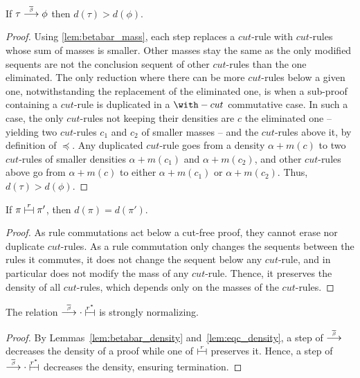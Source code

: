 \documentclass{lmcs}
\newcommand{\symboltext}[2]{\mathrel{\overset{\makebox[0pt]{\mbox{\normalfont\tiny\sffamily \ensuremath{#1}}}}{#2}}} %
\newcommand{\betabar}{\overline{\beta}}
\newcommand{\betabarto}{\symboltext{\betabar}{\longrightarrow}}
\newcommand{\vdashv}{\mathrel{\lower .22ex \hbox{$\vdash\!\dashv$}}}
\DeclareRobustCommand{\astsymbol}[1]{\mathrel{\ooalign{{$\vdashv$}\crcr{$\stackrel{#1}{\hphantom{\vdashv}\vphantom{\to}}$}}}}
\newcommand{\eqcone}{\astsymbol{r}} %
\newcommand{\eqc}{\astsymbol{r^\ast}} %
\newcommand*{\mass}[1]{m(#1)}
\newcommand*{\density}[1]{d(#1)}
\newcommand*{\ordercut}{\preccurlyeq}
\begin{document}
\begin{lem}
\label{lem:betabar_density}
If $\tau \betabarto \phi$ then $\density{\tau} > \density{\phi}$.
\end{lem}
\begin{proof}
Using \autoref{lem:betabar_mass}, each step replaces a $cut$-rule with $cut$-rules whose sum of masses is smaller.
Other masses stay the same as the only modified sequents are not the conclusion sequent of other $cut$-rules than the one eliminated.
The only reduction where there can be more $cut$-rules below a given one, notwithstanding the replacement of the eliminated one, is when a sub-proof containing a $cut$-rule is duplicated in a $\with-cut$ commutative case.
In such a case, the only $cut$-rules not keeping their densities are $c$ the eliminated one -- yielding two $cut$-rules $c_1$ and $c_2$ of smaller masses -- and the $cut$-rules above it, by definition of $\ordercut$.
Any duplicated $cut$-rule goes from a density $\alpha + \mass{c}$ to two $cut$-rules of smaller densities $\alpha + \mass{c_1}$ and $\alpha + \mass{c_2}$, and other $cut$-rules above go from $\alpha + \mass{c}$ to either $\alpha + \mass{c_1}$ or $\alpha + \mass{c_2}$.
Thus, $\density{\tau} > \density{\phi}$.
\end{proof}

\begin{lem}
\label{lem:eqc_density}
If $\pi \eqcone \pi'$, then $\density{\pi} = \density{\pi'}$.
\end{lem}
\begin{proof}
As rule commutations act below a cut-free proof, they cannot erase nor duplicate $cut$-rules.
As a rule commutation only changes the sequents between the rules it commutes, it does not change the sequent below any $cut$-rule, and in particular does not modify the mass of any $cut$-rule.
Thence, it preserves the density of all $cut$-rules, which depends only on the masses of the $cut$-rules.
\end{proof}

\begin{prop}
\label{lem:beta_wn}
The relation $\betabarto \cdot \eqc$ is strongly normalizing.
\end{prop}
\begin{proof}
By Lemmas~\ref{lem:betabar_density} and~\ref{lem:eqc_density}, a step of $\betabarto$ decreases the density of a proof while one of $\eqcone$ preserves it.
Hence, a step of $\betabarto \cdot \eqc$ decreases the density, ensuring termination.
\end{proof}
\end{document}
